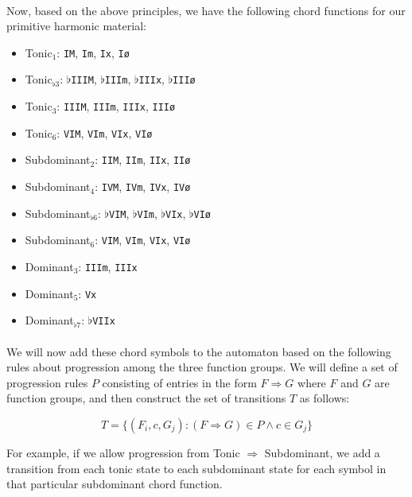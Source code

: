 \documentclass[]{article}
\begin{document}
\paragraph{} Now, based on the above principles, we have the following chord functions for our primitive harmonic material:
\begin{itemize}
	\item{Tonic$_{1}$:} \texttt{IM}, \texttt{Im}, \texttt{Ix}, \texttt{I\o}
	\item{Tonic$_{\flat 3}$:} $\flat$\texttt{IIIM}, $\flat$\texttt{IIIm}, $\flat$\texttt{IIIx}, $\flat$\texttt{III\o}
	\item{Tonic$_{3}$:} \texttt{IIIM}, \texttt{IIIm}, \texttt{IIIx}, \texttt{III\o}
	\item{Tonic$_{6}$:} \texttt{VIM}, \texttt{VIm}, \texttt{VIx}, \texttt{VI\o}
	\item{Subdominant$_{2}$:} \texttt{IIM}, \texttt{IIm}, \texttt{IIx}, \texttt{II\o}
	\item{Subdominant$_{4}$:} \texttt{IVM}, \texttt{IVm}, \texttt{IVx}, \texttt{IV\o}
	\item{Subdominant$_{\flat 6}$:} $\flat$\texttt{VIM}, $\flat$\texttt{VIm}, $\flat$\texttt{VIx}, $\flat$\texttt{VI\o}
	\item{Subdominant$_{6}$:} \texttt{VIM}, \texttt{VIm}, \texttt{VIx}, \texttt{VI\o}
	\item{Dominant$_{3}$:} \texttt{IIIm}, \texttt{IIIx}
	\item{Dominant$_{5}$:} \texttt{Vx}
	\item{Dominant$_{\flat 7}$:} $\flat$\texttt{VIIx}
\end{itemize}

\paragraph{} We will now add these chord symbols to the automaton based on the following rules about progression among the three function groups.  We will define a set of progression rules $P$ consisting of entries in the form $F \Rightarrow G$ where $F$ and $G$ are function groups, and then construct the set of transitions $T$ as follows:

$$T = \{(F_i, c, G_j) : (F \Rightarrow G) \in P \wedge c \in G_j\}$$

For example, if we allow progression from Tonic $\Rightarrow$ Subdominant, we add a transition from each tonic state to each subdominant state for each symbol in that particular subdominant chord function.
\end{document}
